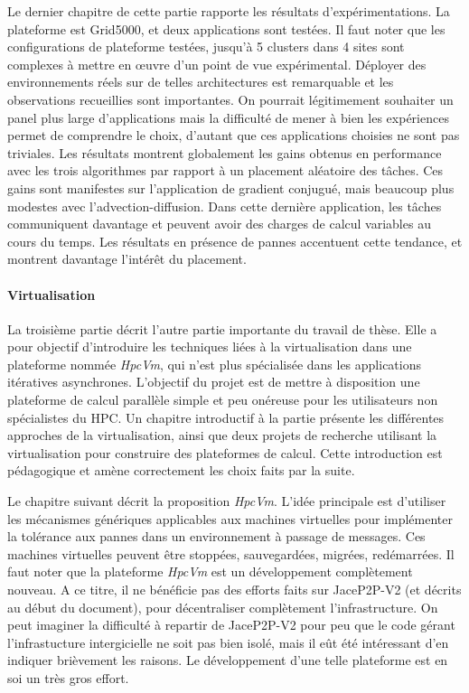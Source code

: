 \documentclass[a4paper,12pt]{article}
\begin{document}
Le dernier chapitre de cette partie rapporte les résultats d'expérimentations.  
La plateforme est Grid5000, et deux applications sont testées. Il faut noter
que les configurations de plateforme testées, jusqu'à 5 clusters dans 4 sites 
sont complexes à mettre en {\oe}uvre d'un point de vue expérimental. Déployer
des environnements réels sur de telles architectures est remarquable et les 
observations recueillies sont importantes. On pourrait légitimement souhaiter
un panel plus large d'applications mais la difficulté de mener à bien les 
expériences permet de comprendre le choix, d'autant que ces applications
choisies ne sont pas triviales.
Les résultats montrent globalement les gains obtenus en performance avec les 
trois algorithmes par rapport à un placement aléatoire des tâches. Ces gains 
sont manifestes sur l'application de gradient conjugué, mais beaucoup plus 
modestes avec l'advection-diffusion. Dans cette dernière application, les tâches 
communiquent davantage et peuvent avoir des charges de calcul variables au cours 
du temps. 
Les résultats en présence de pannes accentuent cette tendance, et montrent
davantage l'intérêt du placement.
 



\paragraph*{Virtualisation}

La troisième partie décrit l'autre partie importante du travail de thèse.
Elle a pour objectif d'introduire les techniques liées à la virtualisation
dans une plateforme nommée \textit{HpcVm}, qui n'est plus spécialisée
dans les applications itératives asynchrones. L'objectif du projet est
de mettre à disposition une plateforme de calcul parallèle simple et peu 
onéreuse pour les utilisateurs non spécialistes du HPC. 
Un chapitre introductif à la partie présente les différentes approches
de la virtualisation, ainsi que deux projets de recherche utilisant
la virtualisation pour construire des plateformes de calcul. Cette
introduction est pédagogique et amène correctement les choix faits
par la suite.

Le chapitre suivant décrit la proposition \textit{HpcVm}.  L'idée
principale est d'utiliser les mécanismes génériques applicables 
aux machines virtuelles pour implémenter la tolérance aux pannes
dans un environnement à passage de messages. Ces machines virtuelles 
peuvent être stoppées, sauvegardées, migrées, redémarrées. 
Il faut noter que la plateforme \textit{HpcVm} est un développement
complètement nouveau. A ce titre, il ne bénéficie pas des efforts
faits sur JaceP2P-V2 (et décrits au début du document), pour décentraliser 
complètement l'infrastructure. On peut imaginer la difficulté à repartir
de JaceP2P-V2 pour peu que le code gérant l'infrastucture intergicielle
ne soit pas bien isolé, mais il eût été intéressant d'en indiquer 
brièvement les raisons. Le développement d'une telle plateforme est en 
soi un très gros effort. 
\end{document}
